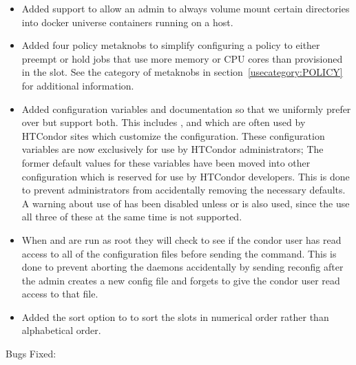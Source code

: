 \begin{itemize}

\item Added support to allow an admin to always volume mount
	certain directories into docker universe containers running
	on a host.

\item Added four policy metaknobs to simplify configuring a policy
	to either preempt or hold jobs that use more memory
	or CPU cores than provisioned in the slot. See the 
	category of metaknobs in section~\ref{usecategory:POLICY} for
	additional information.

\item Added configuration variables and documentation so that we uniformly prefer
     over  but support both. This includes
    ,  and 
    which are often used by HTCondor sites which customize the configuration. These
    configuration variables are now exclusively for use by HTCondor administrators;
    The former default values for these variables have been moved into other configuration
    which is reserved for use by HTCondor developers.  This is done to prevent administrators
    from accidentally removing the necessary defaults.
    A warning about use of  has been disabled unless
     or  is also used, since
    the use all three of these at the same time is not supported.

\item When  and  are run as root
    they will check to see if the condor user has read access to all of the
    configuration files before sending the command. This is done to prevent aborting the daemons
    accidentally by sending reconfig after the admin creates a new config file and
    forgets to give the condor user read access to that file.

\item Added the  sort option to  to sort the slots
    in numerical order rather than alphabetical order.

\end{itemize}

\noindent Bugs Fixed:

